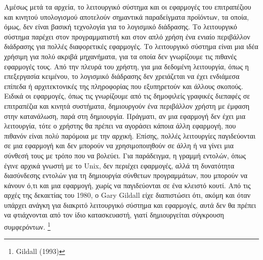 \documentclass[
]{article}
\begin{document}
Αμέσως μετά τα αρχεία, το λειτουργικό σύστημα και οι εφαρμογές του
επιτραπέζιου και κινητού υπολογισμού αποτελούν σημαντικά παραδείγματα
προϊόντων, τα οποία, όμως, δεν είναι βασική τεχνολογία για το λογισμικό
διάδρασης. Το λειτουργικό σύστημα παρέχει στον προγραμματιστή και στον
απλό χρήση ένα ενιαίο περιβάλλον διάδρασης για πολλές διαφορετικές
εφαρμογές. Το λειτουργικό σύστημα είναι μια ιδέα χρήσιμη για πολύ ακριβά
μηχανήματα, για τα οποία δεν γνωρίζουμε τις πιθανές εφαρμογές τους. Από
την πλευρά του χρήστη, για μια δεδομένη λειτουργία, όπως η επεξεργασία
κειμένου, το λογισμικό διάδρασης δεν χρειάζεται να έχει ενδιάμεσα
επίπεδα ή αρχιτεκτονικές της πληροφορίας που εξυπηρετούν και άλλους
σκοπούς. Ειδικά οι εφαρμογές, όπως τις γνωρίζουμε από τις δημοφιλείς
γραφικές διεπαφές σε επιτραπέζια και κινητά συστήματα, δημιουργούν ένα
περιβάλλον χρήστη με έμφαση στην κατανάλωση, παρά στη δημιουργία.
Πράγματι, αν μια εφαρμογή δεν έχει μια λειτουργία, τότε ο χρήστης θα
πρέπει να αγοράσει κάποια άλλη εφαρμογή, που πιθανόν είναι πολύ παρόμοια
με την αρχική. Επίσης, πολλές λειτουργίες παγιδεύονται σε μια εφαρμογή
και δεν μπορούν να χρησιμοποιηθούν σε άλλη ή να γίνει μια σύνθεσή τους
με τρόπο που να βολεύει. Για παράδειγμα, η γραμμή εντολών, όπως έγινε
αρχικά γνωστή με το Unix, δεν περιέχει εφαρμογές, αλλά τη δυνατότητα
διασύνδεσης εντολών για τη δημιουργία σύνθετων προγραμμάτων, που μπορούν
να κάνουν ό,τι και μια εφαρμογή, χωρίς να παγιδεύονται σε ένα κλειστό
κουτί. Από τις αρχές της δεκαετίας του 1980, ο Gary Gildall είχε
διαπιστώσει ότι, ακόμη και όταν υπάρχει ανάγκη για διακριτό λειτουργικό
σύστημα και εφαρμογές, αυτά δεν θα πρέπει να φτιάχνονται από τον ίδιο
κατασκευαστή, γιατί δημιουργείται σύγκρουση συμφερόντων. \footnote{Gildall
  (1993)}
\end{document}
